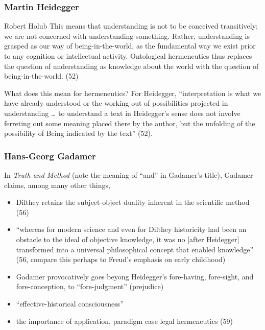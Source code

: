 \documentclass[xcolor=dvipsnames]{beamer}
\begin{document}
\begin{frame}
  \frametitle{Martin Heidegger}
  \begin{block}{Robert Holub}
    This means that understanding is not to be conceived transitively;
    we are not concerned with understanding something. Rather,
    understanding is grasped as our way of being-in-the-world, as the
    fundamental way we exist prior to any cognition or intellectual
    activity. Ontological hermeneutics thus replaces the question of
    understanding as knowledge about the world with the question of
    being-in-the-world. (52)
  \end{block}
What does this mean for hermeneutics? For Heidegger, ``interpretation
is what we have already understood or the working out of possibilities
projected in understanding {\ldots} to understand a text in
Heidegger's sense does not involve ferreting out some meaning placed
there by the author, but the unfolding of the possibility of Being
indicated by the text'' (52).
\end{frame}

\begin{frame}
  \frametitle{Hans-Georg Gadamer}
  In \emph{Truth and Method} (note the meaning of ``and'' in Gadamer's
  title), Gadamer claims, among many other things,
  \begin{itemize}
  \item Dilthey retains the subject-object duality inherent in the
    scientific method (56)
  \item ``whereas for modern science and even for Dilthey historicity
    had been an obstacle to the ideal of objective knowledge, it was
    no [after Heidegger] transformed into a universal philosophical
    concept that enabled knowledge'' (56, compare this perhaps to
    Freud's emphasis on early childhood)
  \item Gadamer provocatively goes beyong Heidegger's fore-having,
    fore-sight, and fore-conception, to ``fore-judgment'' (prejudice)
  \item ``effective-historical consciousness''
  \item the importance of application, paradigm case legal
    hermeneutics (59)
  \end{itemize}
\end{frame}
\end{document}
